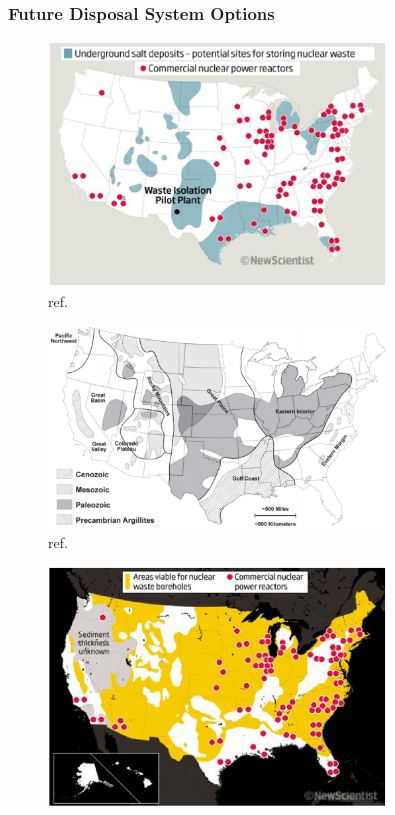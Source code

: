 
\begin{frame}[ctb!]
  \frametitle{Future Disposal System Options}
   \begin{minipage}{0.44\textwidth}
     \begin{figure}[h!]
         \includegraphics[width=0.8\textwidth]{saltNewScientist.eps}
         \caption{ref. \cite{newscientist_where_2011}}
     \end{figure}
     \begin{figure}[h!]
         \includegraphics[width=0.8\textwidth]{clayGonzales.eps}
         \caption{ref. \cite{gonzales_shales_1985}}
     \end{figure}
   \end{minipage}
   \hspace{0.01cm}
   \begin{minipage}{0.44\textwidth}
     \begin{figure}[h!]
         \includegraphics[width=0.8\textwidth]{boreholeNewScientist.eps}

\end{figure}
\end{minipage}
\end{frame}
